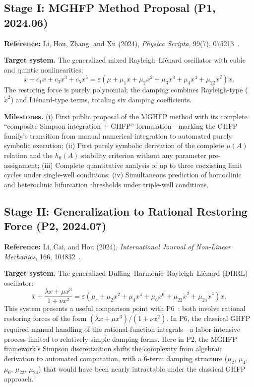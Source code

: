 \documentclass[11pt,a4paper]{article}
\begin{document}
\subsection{Stage I: MGHFP Method Proposal (P1, 2024.06)}

\textbf{Reference:} Li, Hou, Zhang, and Xu (2024), \textit{Physica Scripta}, 99(7), 075213~\cite{P1}.

\medskip
\noindent\textbf{Target system.} The generalized mixed Rayleigh--Li\'enard oscillator with cubic and quintic nonlinearities:
\begin{equation}
\ddot{x} + c_1 x + c_3 x^3 + c_5 x^5 = \varepsilon(\mu + \mu_1 x + \mu_2 x^2 + \mu_3 x^3 + \mu_4 x^4 + \mu_{22} \dot{x}^2)\dot{x}.
\label{eq:P1}
\end{equation}
The restoring force is purely polynomial; the damping combines Rayleigh-type ($\dot{x}^2$) and Li\'enard-type terms, totaling six damping coefficients.

\medskip
\noindent\textbf{Milestones.} (i) First public proposal of the MGHFP method with its complete ``composite Simpson integration + GHFP'' formulation---marking the GHFP family's transition from manual numerical integration to automated purely symbolic execution; (ii) First purely symbolic derivation of the complete $\mu(A)$ relation and the $h_0(A)$ stability criterion without any parameter pre-assignment; (iii) Complete quantitative analysis of up to three coexisting limit cycles under single-well conditions; (iv) Simultaneous prediction of homoclinic and heteroclinic bifurcation thresholds under triple-well conditions.

\subsection{Stage II: Generalization to Rational Restoring Force (P2, 2024.07)}

\textbf{Reference:} Li, Cai, and Hou (2024), \textit{International Journal of Non-Linear Mechanics}, 166, 104832~\cite{P2}.

\medskip
\noindent\textbf{Target system.} The generalized Duffing--Harmonic--Rayleigh--Li\'enard (DHRL) oscillator:
\begin{equation}
\ddot{x} + \frac{\lambda x + \mu x^3}{1 + \nu x^2} = \varepsilon(\mu_c + \mu_2 x^2 + \mu_4 x^4 + \mu_6 x^6 + \mu_{22} \dot{x}^2 + \mu_{24} \dot{x}^4)\dot{x}.
\label{eq:P2}
\end{equation}
This system presents a useful comparison point with P6~\cite{P6}: both involve rational restoring forces of the form $(\lambda x + \mu x^3)/(1 + \nu x^2)$. In P6, the classical GHFP required manual handling of the rational-function integrals---a labor-intensive process limited to relatively simple damping forms. Here in P2, the MGHFP framework's Simpson discretization shifts the complexity from algebraic derivation to automated computation, with a 6-term damping structure ($\mu_2$, $\mu_4$, $\mu_6$, $\mu_{22}$, $\mu_{24}$) that would have been nearly intractable under the classical GHFP approach.
\end{document}

